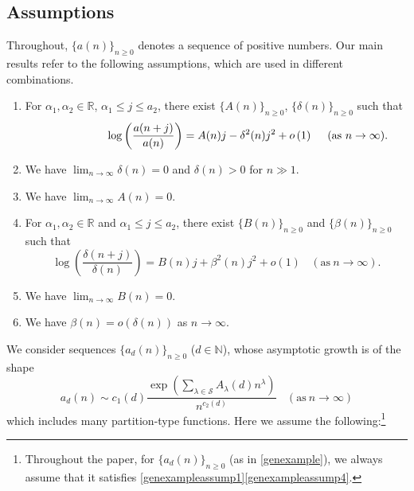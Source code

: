 \documentclass[11pt,reqno,a4paper]{amsart}
\renewcommand{\a}{\alpha}
\renewcommand{\b}{\beta}
\renewcommand{\d}{{\delta}}
\renewcommand{\l}{\lambda}
\renewcommand{\(}{\left\(}
\renewcommand{\)}{\right\)}
\numberwithin{equation}{section}
\theoremstyle{plain}
\theoremstyle{definition} %
\numberwithin{equation}{section}
\begin{document}
\subsection{Assumptions} 
 Throughout, $\{a(n)\}_{n\ge 0}$ denotes a sequence of positive numbers. Our  main results  refer to the following assumptions, which are used in different combinations. %
 \begin{enumerate}[label=(C\arabic*)]
  \item \label{GenGORZThm1assump1} For $\a_1,\a_2\in \mathbb{R}$, $\a_1\le j\le a_2$, there exist $\{A(n)\}_{n\ge 0}$, $\{\d(n)\}_{n\ge 0}$ such that
 \begin{equation*}%
 \hspace{2 cm}\log\left(\frac{a(n+j)}{a(n)}\right)=A(n)j-\d^2(n)j^2+o\left(1\right)\ \ \ \ (\text{as}\ n\to \infty).
 \end{equation*}
  \item \label{GenGORZThm1assump2} We have $\lim_{n\to \infty}\d(n)=0$ and $\d(n)>0$ for $n\!\gg\!1$.
 \item \label{genthmassump2} We have $\lim_{n\to \infty}A(n)=0$.
	\item \label{InflogconcaveThmassump1} For $\a_1,\a_2\in \mathbb{R}$ and  $\a_1\le j\le a_2$, there exist $\{B(n)\}_{n\ge 0}$ and $\{\b(n)\}_{n\ge 0}$ such that  %
	\begin{equation*}%
	\log\left(\frac{\d(n+j)}{\d(n)}\right)=B(n)j+\b^2(n)j^2+o\left(1\right)\ \ \ \ (\text{as}\ n\to \infty).
	\end{equation*}
	\item \label{InflogconcaveThmassump2} We have $\lim_{n\to \infty}B(n)= 0$.
	\item \label{InflogconcaveThmassump3} We have $\b(n)=o(\d(n))$ as $n\to \infty$.
\end{enumerate}
 We consider sequences $\{a_d(n)\}_{n\ge 0}$ ($d\in \mathbb{N}$), whose asymptotic growth is of the shape 
\begin{equation}\label{genexample}
a_d(n)\sim c_1(d)\frac{\exp\left(\sum_{\l\in \mathcal{S}}A_{\l}(d)n^{\l}\right)}{n^{c_2(d) }}\ \ \ \ (\text{as}\ n\to \infty)
\end{equation}
 which includes many partition-type functions. Here we assume the following:\footnote{Throughout the paper, for $\{a_d(n)\}_{n\ge 0}$ (as in \eqref{genexample}), we always assume that it satisfies \ref{genexampleassump1}\textendash\ref{genexampleassump4}.}
\end{document}
